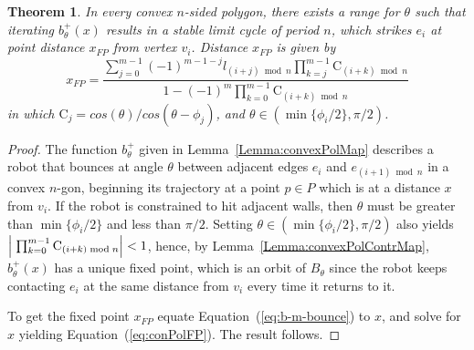 \documentclass[10pt,a4paper]{article}
\newtheorem{theorem}{\bf Theorem}
\begin{document}
\begin{theorem} \label{Theorem:cycleExistence}
In every convex $n$-sided polygon, there exists a range for $\theta$ such that iterating $b^+_{\theta}(x)$ results in a stable limit cycle of period $n$, which strikes $e_i$ at point distance $x_{FP}$ from vertex $v_i$. Distance $x_{FP}$ is given by
\begin{equation} \label{eq:conPolFP}
x_{FP} = \frac{ \sum_{j=0}^{m-1}(-1)^{m-1-j} l_{(i+j)\bmod n} \prod_{k=j}^{m-1} \mathrm{C}_{(i+k)\bmod n} }{1- (-1)^{m} \prod_{k=0}^{m-1} \mathrm{C}_{(i+k)\bmod n}}
\end{equation}
\noindent in which $\mathrm{C}_{j}=cos(\theta) / cos(\theta - \phi_j)$, and $\theta \in (\min\{\phi_i / 2 \}, \pi/2 )$.
\end{theorem}
\begin{proof}
The function $b^+_{\theta}$ given in Lemma~\ref{Lemma:convexPolMap} describes a robot that bounces at angle $\theta$ between adjacent edges $e_i$ and $e_{(i+1)\bmod n}$ in a convex $n$-gon, beginning its trajectory at a point $p \in P$ which is at a distance $x$ from $v_i$. If the robot is constrained to hit adjacent walls, then $\theta$ must be greater than  $\min\{\phi_i / 2 \}$ and less than $\pi/2$. Setting $\theta \in (\min\{\phi_i / 2 \}, \pi/2 )$ also yields $\abs{\;\prod_{k=0}^{m-1} \mathrm{C}_{(i+k)\bmod n}} < 1$, hence, by Lemma~\ref{Lemma:convexPolContrMap}, $b^+_{\theta}(x)$ has a unique fixed point, which is an orbit of $B_\theta$ since the robot keeps contacting $e_i$ at the same distance from $v_i$ every time it returns to it. 

To get the fixed point $x_{FP}$ equate Equation~(\ref{eq:b-m-bounce}) to $x$, and solve for $x$ yielding Equation~(\ref{eq:conPolFP}). The result follows.
\end{proof}
\end{document}
